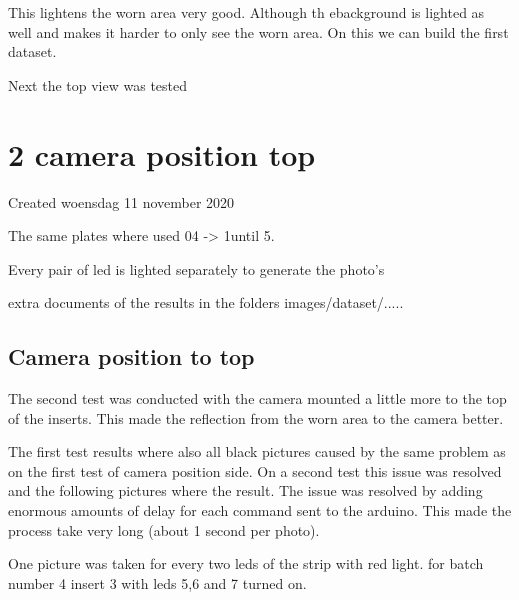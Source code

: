 This lightens the worn area very good. Although th ebackground is lighted as well and makes it harder to only see the worn area. On this we can build the first dataset. 

Next the top view was tested 


		\section{2 camera position top}

Created woensdag 11 november 2020



The same plates where used 04 -\textgreater{} 1until 5. 

Every pair of led is lighted separately to generate the photo's 



extra documents of the results in the folders images/dataset/.....



\subsection{Camera position to top}

The second test was conducted with the camera mounted a little more to the top of the inserts. This made the reflection from the worn area to the camera better. 

The first test results where also all black pictures caused by the same problem as on the first test of camera position side. On a second test this issue was resolved and the following pictures where the result. The issue was resolved by adding enormous amounts of delay for each command sent to the arduino. This made the process take very long (about 1 second per photo).



One picture was taken for every two leds of the strip with red light. for batch number 4 insert 3 with leds 5,6 and 7 turned on.



